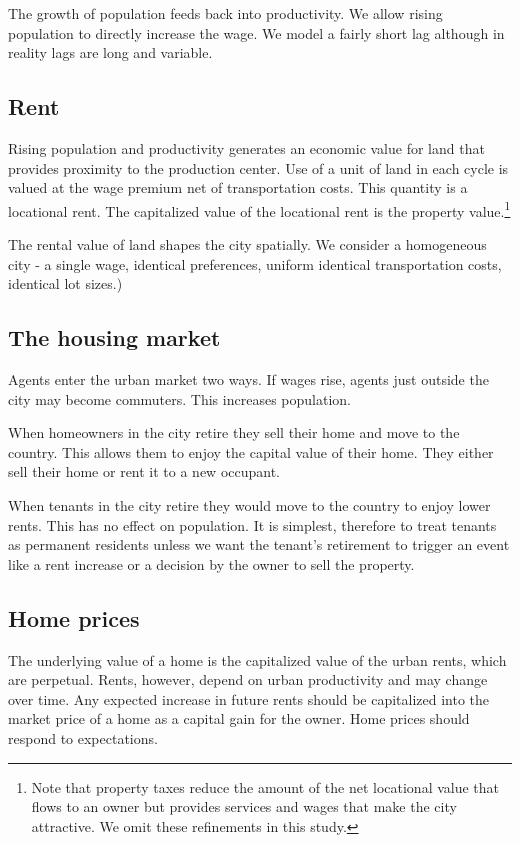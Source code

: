 The growth of population feeds back into productivity. We allow rising population to directly increase the wage.  We model a fairly short lag although in reality lags are long and variable. 



\subsection{Rent}
Rising population and productivity generates an economic value for land that provides proximity to the production center. Use of a unit of land in each cycle is valued at the wage premium net of transportation costs. This quantity is a locational rent. The capitalized value of the locational rent is the property value.\footnote{Note that property taxes reduce the amount of the net locational value that flows to an owner but provides services and wages that make the city attractive. We omit these refinements in this study.}

The rental value of land shapes the city spatially.  We consider a homogeneous city - a single wage, identical preferences, uniform identical transportation costs, identical lot sizes.)



\subsection{The housing market}
Agents enter the urban market two ways. If wages rise, agents just outside the city may become commuters. This increases population. 

When homeowners in the city retire they sell their home and move to the country. This allows them  to enjoy the capital value of their home.  They either sell their home or rent it to a new occupant. 

When  tenants in the city retire they would move to the country to enjoy lower rents. This has no effect on population. It is simplest, therefore to treat tenants as permanent residents unless we want the tenant's retirement to trigger an event like a rent increase or a decision by the owner to sell the property.



\subsection{Home prices}
The underlying value of a home is the capitalized value of the urban rents, which are perpetual.  Rents, however, depend on urban productivity and may change over time. Any expected increase in future rents should be capitalized into the market price of a home as a capital gain for the owner. Home prices should respond to expectations.

